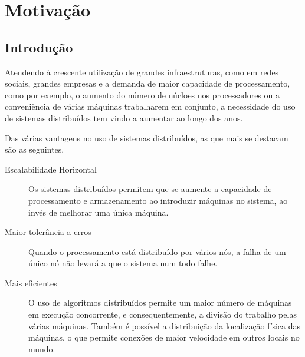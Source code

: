 \chapter{Motivação}
\label{chap:estado-da-arte}

\section{Introdução}
\label{chap2:sec:intro}



Atendendo à crescente utilização de grandes infraestruturas, como em redes sociais, grandes empresas e a demanda de maior capacidade de processamento, como por exemplo, o aumento do número de núcloes nos processadores ou a conveniência de várias máquinas trabalharem em conjunto, a necessidade do uso de sistemas distribuídos tem vindo a aumentar ao longo dos anos.

Das várias vantagens no uso de sistemas distribuídos, as que mais se destacam são as seguintes.
\begin{description}
    \item [Escalabilidade Horizontal] Os sistemas distribuídos permitem que se aumente a capacidade de processamento e armazenamento ao introduzir máquinas no sistema, ao invés de melhorar uma única máquina.
	
    \item [Maior tolerância a erros]Quando o processamento está distribuído por vários nós, a falha de um único nó não levará a que o sistema num todo falhe.

    \item [Mais eficientes] O uso de algoritmos distribuídos permite um maior número de máquinas em execução concorrente, e consequentemente, a divisão do trabalho pelas várias máquinas.
	Também é possível a distribuição da localização física das máquinas, o que permite conexões de maior velocidade em outros locais no mundo.

\end{description}

